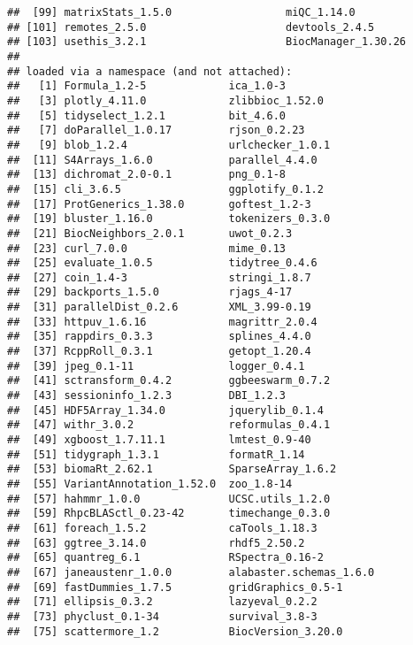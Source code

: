 \documentclass[
  11pt,
  a4paper,
]{article}
\begin{document}
\begin{verbatim}
##  [99] matrixStats_1.5.0                  miQC_1.14.0                       
## [101] remotes_2.5.0                      devtools_2.4.5                    
## [103] usethis_3.2.1                      BiocManager_1.30.26               
## 
## loaded via a namespace (and not attached):
##   [1] Formula_1.2-5             ica_1.0-3                
##   [3] plotly_4.11.0             zlibbioc_1.52.0          
##   [5] tidyselect_1.2.1          bit_4.6.0                
##   [7] doParallel_1.0.17         rjson_0.2.23             
##   [9] blob_1.2.4                urlchecker_1.0.1         
##  [11] S4Arrays_1.6.0            parallel_4.4.0           
##  [13] dichromat_2.0-0.1         png_0.1-8                
##  [15] cli_3.6.5                 ggplotify_0.1.2          
##  [17] ProtGenerics_1.38.0       goftest_1.2-3            
##  [19] bluster_1.16.0            tokenizers_0.3.0         
##  [21] BiocNeighbors_2.0.1       uwot_0.2.3               
##  [23] curl_7.0.0                mime_0.13                
##  [25] evaluate_1.0.5            tidytree_0.4.6           
##  [27] coin_1.4-3                stringi_1.8.7            
##  [29] backports_1.5.0           rjags_4-17               
##  [31] parallelDist_0.2.6        XML_3.99-0.19            
##  [33] httpuv_1.6.16             magrittr_2.0.4           
##  [35] rappdirs_0.3.3            splines_4.4.0            
##  [37] RcppRoll_0.3.1            getopt_1.20.4            
##  [39] jpeg_0.1-11               logger_0.4.1             
##  [41] sctransform_0.4.2         ggbeeswarm_0.7.2         
##  [43] sessioninfo_1.2.3         DBI_1.2.3                
##  [45] HDF5Array_1.34.0          jquerylib_0.1.4          
##  [47] withr_3.0.2               reformulas_0.4.1         
##  [49] xgboost_1.7.11.1          lmtest_0.9-40            
##  [51] tidygraph_1.3.1           formatR_1.14             
##  [53] biomaRt_2.62.1            SparseArray_1.6.2        
##  [55] VariantAnnotation_1.52.0  zoo_1.8-14               
##  [57] hahmmr_1.0.0              UCSC.utils_1.2.0         
##  [59] RhpcBLASctl_0.23-42       timechange_0.3.0         
##  [61] foreach_1.5.2             caTools_1.18.3           
##  [63] ggtree_3.14.0             rhdf5_2.50.2             
##  [65] quantreg_6.1              RSpectra_0.16-2          
##  [67] janeaustenr_1.0.0         alabaster.schemas_1.6.0  
##  [69] fastDummies_1.7.5         gridGraphics_0.5-1       
##  [71] ellipsis_0.3.2            lazyeval_0.2.2           
##  [73] phyclust_0.1-34           survival_3.8-3           
##  [75] scattermore_1.2           BiocVersion_3.20.0       

\end{verbatim}
\end{document}
